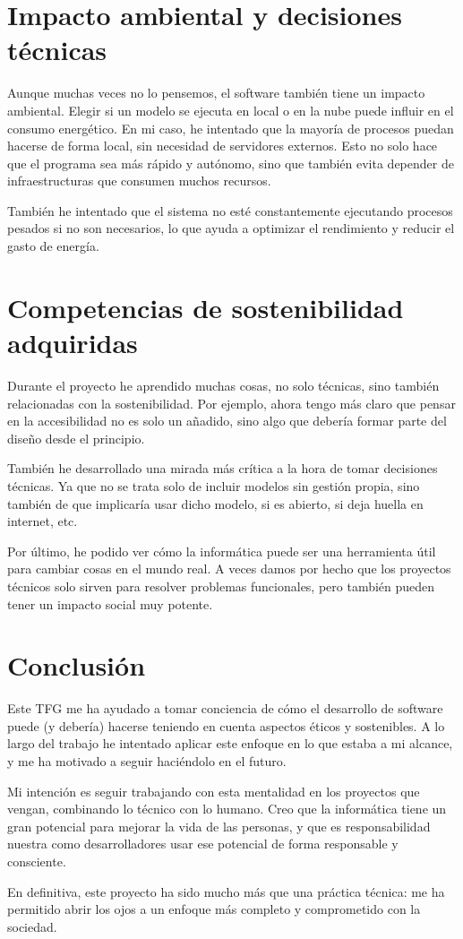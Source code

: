 \section{Impacto ambiental y decisiones técnicas}

Aunque muchas veces no lo pensemos, el software también tiene un impacto ambiental. Elegir si un modelo se ejecuta en local o en la nube puede influir en el consumo energético. En mi caso, he intentado que la mayoría de procesos puedan hacerse de forma local, sin necesidad de servidores externos. Esto no solo hace que el programa sea más rápido y autónomo, sino que también evita depender de infraestructuras que consumen muchos recursos.

También he intentado que el sistema no esté constantemente ejecutando procesos pesados si no son necesarios, lo que ayuda a optimizar el rendimiento y reducir el gasto de energía.

\section{Competencias de sostenibilidad adquiridas}

Durante el proyecto he aprendido muchas cosas, no solo técnicas, sino también relacionadas con la sostenibilidad. Por ejemplo, ahora tengo más claro que pensar en la accesibilidad no es solo un añadido, sino algo que debería formar parte del diseño desde el principio.

También he desarrollado una mirada más crítica a la hora de tomar decisiones técnicas. Ya que no se trata solo de incluir modelos sin gestión propia, sino también de que implicaría usar dicho modelo, si es abierto, si deja huella en internet, etc.

Por último, he podido ver cómo la informática puede ser una herramienta útil para cambiar cosas en el mundo real. A veces damos por hecho que los proyectos técnicos solo sirven para resolver problemas funcionales, pero también pueden tener un impacto social muy potente.

\section{Conclusión}

Este TFG me ha ayudado a tomar conciencia de cómo el desarrollo de software puede (y debería) hacerse teniendo en cuenta aspectos éticos y sostenibles. A lo largo del trabajo he intentado aplicar este enfoque en lo que estaba a mi alcance, y me ha motivado a seguir haciéndolo en el futuro.

Mi intención es seguir trabajando con esta mentalidad en los proyectos que vengan, combinando lo técnico con lo humano. Creo que la informática tiene un gran potencial para mejorar la vida de las personas, y que es responsabilidad nuestra como desarrolladores usar ese potencial de forma responsable y consciente.

En definitiva, este proyecto ha sido mucho más que una práctica técnica: me ha permitido abrir los ojos a un enfoque más completo y comprometido con la sociedad.